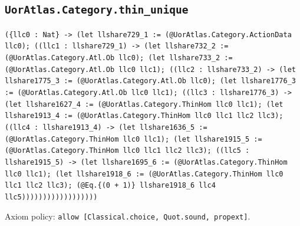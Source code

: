 \documentclass[11pt]{article}
\begin{document}
\subsection*{\texttt{UorAtlas.Category.thin\_unique}}
\noindent\texttt{(\{llc0 : Nat\} -> (let llshare729\_1 := (@UorAtlas.Category.ActionData llc0); ((llc1 : llshare729\_1) -> (let llshare732\_2 := (@UorAtlas.Category.Atl.Ob llc0); (let llshare733\_2 := (@UorAtlas.Category.Atl.Ob llc0 llc1); ((llc2 : llshare733\_2) -> (let llshare1775\_3 := (@UorAtlas.Category.Atl.Ob llc0); (let llshare1776\_3 := (@UorAtlas.Category.Atl.Ob llc0 llc1); ((llc3 : llshare1776\_3) -> (let llshare1627\_4 := (@UorAtlas.Category.ThinHom llc0 llc1); (let llshare1913\_4 := (@UorAtlas.Category.ThinHom llc0 llc1 llc2 llc3); ((llc4 : llshare1913\_4) -> (let llshare1636\_5 := (@UorAtlas.Category.ThinHom llc0 llc1); (let llshare1915\_5 := (@UorAtlas.Category.ThinHom llc0 llc1 llc2 llc3); ((llc5 : llshare1915\_5) -> (let llshare1695\_6 := (@UorAtlas.Category.ThinHom llc0 llc1); (let llshare1918\_6 := (@UorAtlas.Category.ThinHom llc0 llc1 llc2 llc3); (@Eq.\{(0 + 1)\} llshare1918\_6 llc4 llc5))))))))))))))))))}\par
\noindent Axiom policy: \texttt{allow [Classical.choice, Quot.sound, propext]}.\par
\end{document}
